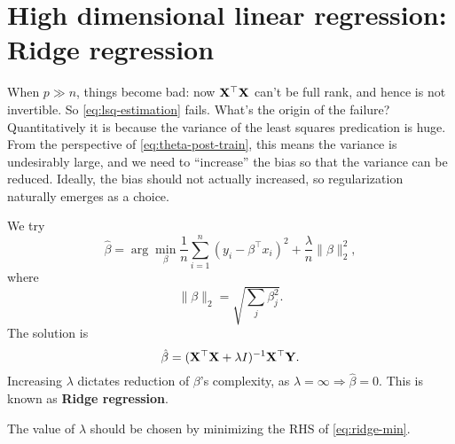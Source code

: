 \documentclass[hyperref, a4paper]{article}
\newcommand*{\argmin}{\arg\min}
\newcommand*{\concept}[1]{{\textbf{#1}}}
\begin{document}
\section{High dimensional linear regression: Ridge regression}

When $p \gg n$, things become bad: now $\vb{X}^\top \vb{X}$ can't be full rank,
and hence is not invertible.
So \eqref{eq:lsq-estimation} fails.
What's the origin of the failure?
Quantitatively it is because the variance of the least squares predication is huge.
From the perspective of \eqref{eq:theta-post-train},
this means the variance is undesirably large,
and we need to ``increase'' the bias so that the variance can be reduced.
Ideally, the bias should not actually increased,
so regularization naturally emerges as a choice.

We try 
\begin{equation}
    \hat{\beta} = \argmin_{\beta} \frac{1}{n} \sum_{i=1}^{n} (y_i - \beta^\top x_i)^2 + \frac{\lambda}{n} \| \beta \|^2_2,
    \label{eq:ridge-min}
\end{equation}
where 
\begin{equation}
    \| \beta \|_2 = \sqrt{\sum_j \beta_j^2}.
\end{equation}
The solution is 
\begin{equation}
    \hat{\beta} = (\vb{X}^\top \vb{X} + \lambda I)^{-1} \vb{X}^\top \vb{Y}.
\end{equation}
Increasing $\lambda$ dictates reduction of $\beta$'s complexity,
as $\lambda = \infty \Rightarrow \hat{\beta} = 0$.
This is known as \concept{Ridge regression}.

The value of $\lambda$ should be chosen by minimizing the RHS of \eqref{eq:ridge-min}.
\end{document}

